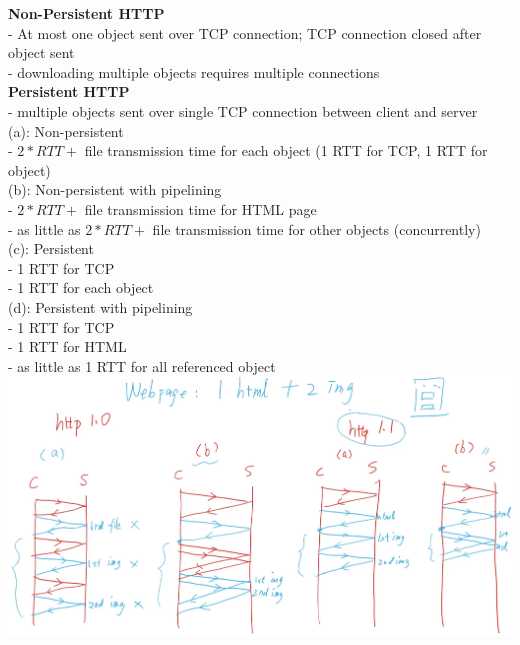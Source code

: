 \documentclass[10pt, a4paper]{article}
\begin{document}
\begin{multicols*}{3}
		\textbf{Non-Persistent HTTP}\\
		- At most one object sent over TCP connection; TCP connection closed after object sent\\
		- downloading multiple objects requires multiple connections\\

		\textbf{Persistent HTTP}\\
		- multiple objects sent over single TCP connection between client and server\\
		(a): Non-persistent\\
		- $2 * RTT + $ file transmission time for each object (1 RTT for TCP, 1 RTT for object)\\
		(b): Non-persistent with pipelining\\
		- $2 * RTT + $ file transmission time for HTML page\\
		- as little as $2 * RTT + $ file transmission time for other objects (concurrently)\\
		(c): Persistent\\
		- 1 RTT for TCP\\
		- 1 RTT for each object\\
		(d): Persistent with pipelining\\
		- 1 RTT for TCP\\
		- 1 RTT for HTML\\
		- as little as 1 RTT for all referenced object\\
		\includegraphics[scale=.12]{./assets/httpDiagrams}


\end{multicols*}
\end{document}
